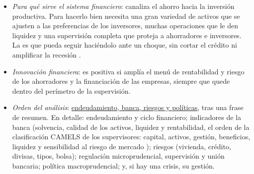 \documentclass[11pt]{article}
\begin{document}
\begin{itemize}
\item \emph{Para qué sirve el sistema financiero}: canaliza el ahorro hacia la inversión productiva. Para hacerlo bien necesita una gran variedad de activos que se ajusten a las preferencias de los inversores, muchas operaciones que le den liquidez y una supervisión completa que proteja a ahorradores e inversores. La  es que pueda seguir haciéndolo ante un choque, sin cortar el crédito ni amplificar la recesión  .
\item \emph{Innovación financiera}: es positiva si amplía el menú de rentabilidad y riesgo de los ahorradores y la financiación de las empresas, siempre que quede dentro del perímetro de la supervisión.
\item \emph{Orden del análisis}: \uline{endeudamiento, banca, riesgos y políticas}, tras una frase de resumen. En detalle: endeudamiento y ciclo financiero; indicadores de la banca (solvencia, calidad de los activos, liquidez y rentabilidad, el orden de la clasificación CAMELS de los supervisores: capital, activos, gestión, beneficios, liquidez y sensibilidad al riesgo de mercado \parencite{FMI2013CaseStudy}); riesgos (vivienda, crédito, divisas, tipos, bolsa); regulación microprudencial, supervisión y unión bancaria; política macroprudencial; y, si hay una crisis, su gestión.
\end{itemize}
\end{document}
